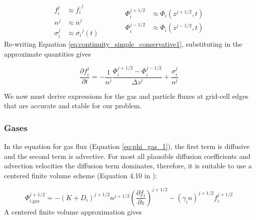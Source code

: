 \begin{equation*}
  \begin{aligned}
    f_i^{j} &\approx \overline{f_i}^{j} \\
    n^{j} &\approx \overline{n}^{j} \\
    \sigma_i^j &\approx \overline{\sigma_i}^j(t)
  \end{aligned}
  \quad\quad\quad
  \begin{aligned}
    \Phi_{i}^{j+1/2} &\approx \Phi_{i}(z^{j+1/2},t) \\
    \Phi_{i}^{j-1/2} &\approx \Phi_{i}(z^{j-1/2},t)
  \end{aligned}
\end{equation*}
Re-writing Equation \eqref{eq:continuity_simple_conservative1}, substituting in the approximate quantities gives

\begin{equation} \label{eq:continuity_simple_approx}
  \frac{\partial f_i^j}{\partial t} = - \frac{1}{n^{j}} \frac{\Phi_{i}^{j+1/2} - \Phi_{i}^{j-1/2}}{\Delta z^j} + \frac{\sigma_i^j}{n^{j}}
\end{equation}

We now must derive expressions for the gas and particle fluxes at grid-cell edges that are accurate and stable for our problem. 


\subsubsection{Gases} \label{sec:FV_gases}

In the equation for gas flux (Equation \eqref{eq:phi_gas_1}), the first term is diffusive and the second term is advective. For most all plausible diffusion coefficients and advection velocities the diffusion term dominates, therefore, it is suitable to use a centered finite volume scheme (Equation 4.10 in \cite{Leveque_2002}):

\begin{equation}
  \Phi_{i\text{,gas}}^{j+1/2} = - ( K + D_{i})^{j+1/2} n^{j+1/2} \left( \frac{\partial f_{i}}{\partial z} \right)^{j+1/2} - (\gamma_{i} n)^{j+1/2} f_{i}^{j+1/2}
\end{equation}
A centered finite volume approximation gives 

